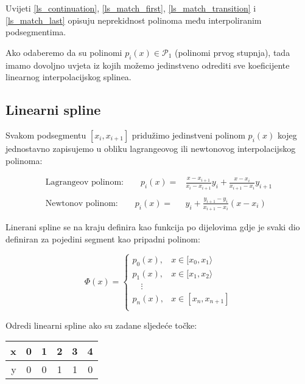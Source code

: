 Uvijeti \ref{ls_continuation}, \ref{ls_match_first}, \ref{ls_match_transition} i \ref{ls_match_last} opisuju neprekidnost polinoma među interpoliranim podsegmentima.

Ako odaberemo da su polinomi $p_i(x)\in\mathcal{P}_1$ (polinomi prvog stupnja), tada imamo dovoljno uvjeta iz kojih možemo jedinstveno odrediti sve koeficijente linearnog interpolacijskog splinea.

\subsection{Linearni spline}

Svakom podsegmentu $[x_i,x_{i+1}]$ pridužimo jedinstveni polinom $p_i(x)$ kojeg jednostavno zapisujemo u obliku lagrangeovog ili newtonovog interpolacijskog polinoma:

\begin{align*}
\text{Lagrangeov polinom:}\qquad p_i(x) =& \frac{x-x_{i+1}}{x_i-x_{i+1}}y_i + \frac{x-x_i}{x_{i+1}-x_i}y_{i+1}\\\\
\text{Newtonov polinom:}\qquad p_i(x) =& y_i + \frac{y_{i+1}-y_i}{x_{i+1}-x_i}(x-x_i)
\end{align*}

Linerani spline se na kraju definira kao funkcija po dijelovima gdje je svaki dio definiran za pojedini segment kao pripadni polinom:

\begin{equation}
    \Phi(x)=\begin{cases}
        p_0(x),&x\in[x_0,x_1\rangle\\
        p_1(x),&x\in[x_1,x_2\rangle\\
        \quad\vdots&\\
        p_n(x),&x\in[x_n,x_{n+1}]\\
    \end{cases}
\end{equation}

\newpage

\begin{examplebox}
    Odredi linearni spline ako su zadane sljedeće točke:

    \center
    \begin{tabular}{r|c|c|c|c|c}
        x&0&1&2&3&4\\
        \hline
        y&0&0&1&1&0
    \end{tabular}
\end{examplebox}

